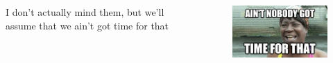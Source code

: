 \documentclass{beamer}
\begin{document}
\begin{frame}
    \begin{columns}
        \begin{column}{0.5\textwidth}
            I don't actually mind them, but we'll assume that we ain't got time for that
        \end{column}
        \begin{column}{0.5\textwidth}
            \begin{figure}
                \centering
                \includegraphics[width=\textwidth,keepaspectratio]{../resources/nobody_got_time.jpg}
            \end{figure}
        \end{column}
    \end{columns}
\end{frame}
\end{document}
